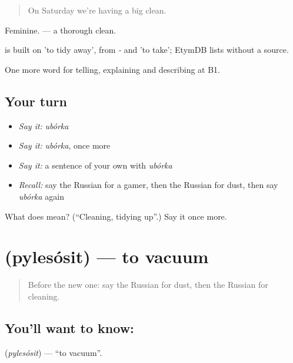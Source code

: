 \begin{quote}
On Saturday we're having a big clean.
\end{quote}

Feminine. \emph{ } — a thorough clean.

\begin{cousinweb}
\emph{} is built on \emph{} 'to tidy away', from \emph{-} and \emph{} 'to take'; EtymDB lists \emph{} without a source.
\end{cousinweb}

\begin{grammarlens}[title={What you've built}]
One more word for telling, explaining and describing at B1.
\end{grammarlens}

\subsection*{Your turn}
\begin{itemize}
\raggedright
  \item \emph{Say it:} \emph{ubórka}
  \item \emph{Say it:} \emph{ubórka}, once more
  \item \emph{Say it:} a sentence of your own with \emph{ubórka}
  \item \emph{Recall:} say the Russian for a gamer, then the Russian for dust, then say \emph{ubórka} again
\end{itemize}

\begin{tcolorbox}[breakable,colback=teal!4,colframe=teal!35!black,title={Before you move on}]
What does  mean? (\textquotedblleft{}Cleaning, tidying up\textquotedblright{}.) Say it once more.
\end{tcolorbox}
\section[\texorpdfstring{\ru{пылесосить} (pylesósit)}{пылесосить (pylesósit)}]{ (pylesósit) — to vacuum}

\label{lesson:RU-C529-pylesosit}



\begin{quote}
Before the new one: say the Russian for dust, then the Russian for cleaning.
\end{quote}

\subsection*{You'll want to know: }
\textbf{} (\emph{pylesósit}) — \textquotedblleft{}to vacuum\textquotedblright{}.

